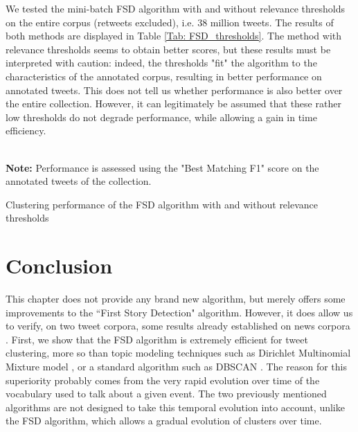 We tested the mini-batch FSD algorithm with and without relevance thresholds on the entire corpus (retweets excluded), i.e. 38 million tweets.  The results of both methods are displayed in Table \ref{Tab: FSD_thresholds}. The method with relevance thresholds seems to obtain better scores, but these results must be interpreted with caution: indeed, the thresholds "fit" the algorithm to the characteristics of the annotated corpus, resulting in better performance on annotated tweets. This does not tell us whether performance is also better over the entire collection. However, it can legitimately be assumed that these rather low thresholds do not degrade performance, while allowing a gain in time efficiency.

\begin{table}[ht]
\begin{center}

\\

{\scriptsize \textbf{Note:} Performance is assessed using the "Best Matching F1" score on the annotated tweets of the collection.}
\caption{Clustering performance of the FSD algorithm with and without relevance thresholds} \label{Tab: FSD_thresholds}
\end{center}
\end{table}


\section{Conclusion}

This chapter does not provide any brand new algorithm, but merely offers some improvements to the ``First Story Detection" algorithm. However, it does allow us to verify, on two tweet corpora, some results already established on news corpora \citep{cage2020production}. First, we show that the FSD algorithm is extremely efficient for tweet clustering, more so than topic modeling techniques such as Dirichlet Multinomial Mixture model \citep{yin_dirichlet_2014}, or a standard algorithm such as DBSCAN \citep{ester1996density}.  The reason for this superiority probably comes from the very rapid evolution over time of the vocabulary used to talk about a given event. The two previously mentioned algorithms are not designed to take this temporal evolution into account, unlike the FSD algorithm, which allows a gradual evolution of clusters over time.

